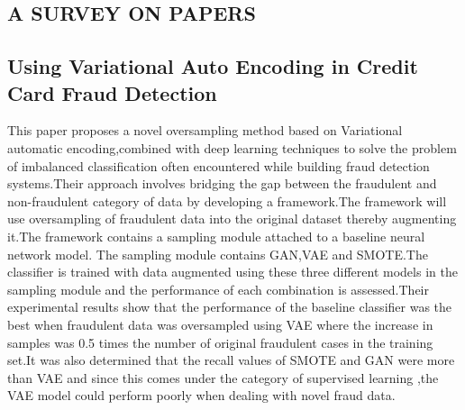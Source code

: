 \documentclass[a4paper, 12pt]{article}
\begin{document}
\begin{center}
\begin{flushleft}
\begin{table}[h!]
\begin{tabular}{|l|l|c|l|l|l|}
 \end{tabular}

\end{table}                             




\end{flushleft}
\end{center}

\newpage
\begin{center}
\section{A SURVEY ON PAPERS}
\end{center}
\subsection{Using Variational Auto Encoding in Credit Card Fraud Detection}
\hspace{1cm}This paper proposes a novel oversampling method based on Variational automatic encoding,combined with deep learning techniques to solve the problem of imbalanced classification often encountered while building fraud detection systems.Their approach involves bridging the gap between the fraudulent and non-fraudulent category of data by developing a framework.The framework will use oversampling of fraudulent data into the original dataset thereby augmenting it.The framework contains a sampling module attached to a baseline neural network model. The sampling module contains GAN,VAE and SMOTE.The classifier is trained with data augmented using these three different models in the sampling module and the performance of each combination is assessed.Their experimental results show that the performance of the baseline classifier was the best when fraudulent data was oversampled using VAE where the increase in samples was 0.5 times the number of original fraudulent cases in the training set.It was also determined that the recall values of SMOTE and GAN were more than VAE and since this comes under the category of supervised learning ,the VAE model could perform poorly when dealing with novel fraud data.
\end{document}
